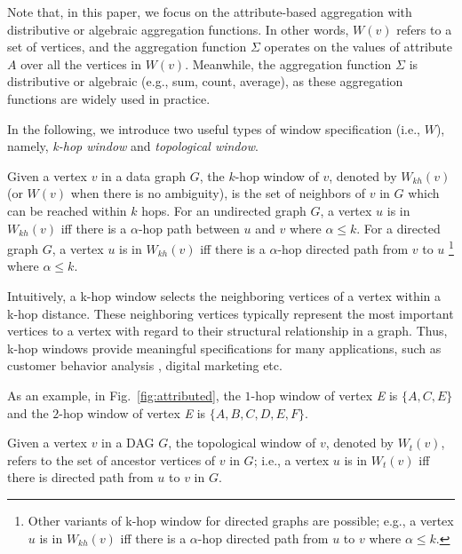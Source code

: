 Note that, in this paper, we focus on the attribute-based aggregation with distributive or algebraic aggregation functions. 
In other words, $W(v)$ refers to a set of vertices, and the aggregation function 
$\Sigma$ operates on the values of attribute $A$ over all the vertices in $W(v)$. Meanwhile, the aggregation function $\Sigma$ is distributive or algebraic (e.g., sum, count, average), as these aggregation functions are widely used in practice. 
 
In the following, we introduce two useful types of window specification (i.e., $W$), namely, 
\emph{k-hop window} and \emph{topological window}.


\begin{definition} 
Given a vertex $v$ in a data graph $G$, 
the $k$-hop window of $v$, denoted by $W_{kh}(v)$ (or $W(v)$ when there is no ambiguity),
is the set of neighbors of $v$ in $G$ which can be reached within $k$ hops.
For an undirected graph $G$,
a vertex $u$ is in $W_{kh}(v)$  iff there is a $\alpha$-hop path between $u$ and $v$ where $\alpha \leqslant k$.
For a directed graph $G$,
a vertex $u$ is in $W_{kh}(v)$  iff there is a $\alpha$-hop directed path from $v$ to $u$ \footnote{
Other variants of k-hop window for directed graphs are possible; e.g.,
a vertex $u$ is in $W_{kh}(v)$  iff there is a $\alpha$-hop directed path from $u$ to $v$ where $\alpha \leqslant k$.
} where $\alpha \leqslant k$.
\end{definition}

Intuitively, a k-hop window selects the neighboring vertices of a 
vertex within a  k-hop distance. 
These neighboring vertices typically represent the most important 
vertices to a vertex with regard to their structural relationship in a graph. 
Thus, k-hop windows provide meaningful specifications for many applications, such as customer behavior analysis \cite{briscoe2013determining,dai2012predicting} , digital marketing \cite{ma2010ego} etc.

As an example, in Fig.~\ref{fig:attributed}, the $1$-hop window of vertex \emph{E} is $\{A,C,E\}$ and the $2$-hop window of vertex \emph{E} is $\{A,B,C,D,E,F\}$.  

\begin{definition} 
Given a vertex $v$ in a DAG $G$, the topological window of $v$, denoted by $W_t(v)$,
refers to the set of ancestor vertices  of $v$ in $G$;
i.e., a vertex $u$ is in $W_t(v)$ iff there is directed path from $u$ to $v$ in $G$.
\end{definition}

